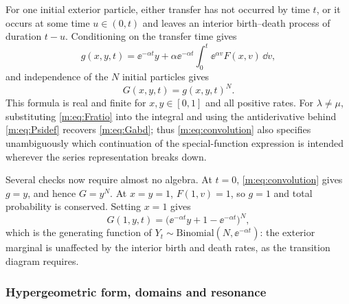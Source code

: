 For one initial exterior particle, either transfer has not occurred by time
$t$, or it occurs at some time $u\in(0,t)$ and leaves an interior
birth--death process of duration $t-u$. Conditioning on the transfer time
gives
\begin{equation}
\label{m:eq:convolution}
g(x,y,t) = \ee^{-\alpha t}y + \alpha\ee^{-\alpha t}\int_0^t\ee^{\alpha v}F(x,v)\,\dd v ,
\end{equation}
and independence of the $N$ initial particles gives
\begin{equation}
\label{m:eq:convolutionpower}
G(x,y,t) = g(x,y,t)^N .
\end{equation}
This formula is real and finite for $x,y\in[0,1]$ and all positive rates. For
$\lambda\neq\mu$, substituting \cref{m:eq:Fratio} into the integral and using
the antiderivative behind \cref{m:eq:Psidef} recovers \cref{m:eq:Gabd}; thus
\cref{m:eq:convolution} also specifies unambiguously which continuation of the
special-function expression is intended wherever the series representation
breaks down.

Several checks now require almost no algebra. At $t=0$,
\cref{m:eq:convolution} gives $g=y$, and hence $G=y^N$. At $x=y=1$,
$F(1,v)=1$, so $g=1$ and total probability is conserved. Setting $x=1$ gives
\begin{equation}
\label{m:eq:exteriorbinomial}
G(1,y,t) = \bigl(\ee^{-\alpha t}y + 1-\ee^{-\alpha t}\bigr)^N ,
\end{equation}
which is the generating function of $Y_t\sim\text{Binomial}(N,\ee^{-\alpha t})$:
the exterior marginal is unaffected by the interior birth and death rates, as
the transition diagram requires.

\subsubsection{Hypergeometric form, domains and resonance}

